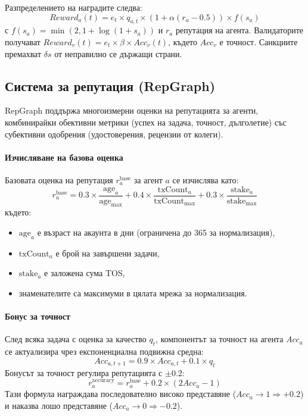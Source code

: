 \documentclass[11pt]{article}
\begin{document}
Разпределението на наградите следва:
\begin{equation}
Reward_a(t) = e_t \times q_{a,t} \times \left(1 + \alpha (r_a - 0.5)\right) \times f(s_a)
\end{equation}
с $f(s_a) = \min(2, 1 + \log(1+s_a))$ и $r_a$ репутация на агента. Валидаторите получават $Reward_v(t) = e_t \times \beta \times Acc_v(t)$, където $Acc_v$ е точност. Санкциите премахват $\delta s$ от неправилно се държащи страни.

\subsection{Система за репутация (RepGraph)}
\label{sec:reputation}
RepGraph поддържа многоизмерни оценки на репутацията за агенти, комбинирайки обективни метрики (успех на задача, точност, дълголетие) със субективни одобрения (удостоверения, рецензии от колеги).

\paragraph{Изчисляване на базова оценка} Базовата оценка на репутация $r_a^{\text{base}}$ за агент $a$ се изчислява като:
\begin{equation}
r_a^{\text{base}} = 0.3 \times \frac{\text{age}_a}{\text{age}_{\max}} + 0.4 \times \frac{\text{txCount}_a}{\text{txCount}_{\max}} + 0.3 \times \frac{\text{stake}_a}{\text{stake}_{\max}}
\end{equation}
където:
\begin{itemize}[noitemsep]
  \item $\text{age}_a$ е възраст на акаунта в дни (ограничена до 365 за нормализация),
  \item $\text{txCount}_a$ е брой на завършени задачи,
  \item $\text{stake}_a$ е заложена сума TOS,
  \item знаменателите са максимуми в цялата мрежа за нормализация.
\end{itemize}

\paragraph{Бонус за точност} След всяка задача с оценка за качество $q_t$, компонентът за точност на агента $Acc_a$ се актуализира чрез експоненциална подвижна средна:
\begin{equation}
Acc_{a,t+1} = 0.9 \times Acc_{a,t} + 0.1 \times q_t
\end{equation}
Бонусът за точност регулира репутацията с $\pm 0.2$:
\begin{equation}
r_a^{\text{accuracy}} = r_a^{\text{base}} + 0.2 \times (2 Acc_a - 1)
\end{equation}
Тази формула награждава последователно високо представяне ($Acc_a \to 1 \Rightarrow +0.2$) и наказва лошо представяне ($Acc_a \to 0 \Rightarrow -0.2$).
\end{document}
